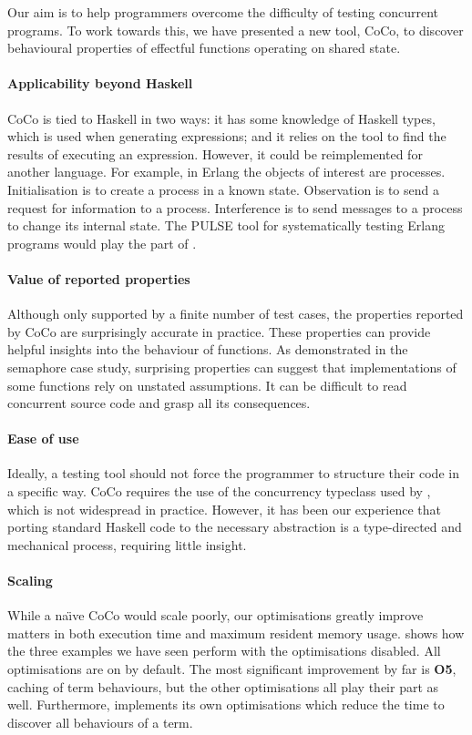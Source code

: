 Our aim is to help programmers overcome the difficulty of testing
concurrent programs.  To work towards this, we have presented a new
tool, CoCo, to discover behavioural properties of effectful functions
operating on shared state.

\paragraph{Applicability beyond Haskell}
CoCo is tied to Haskell in two ways: it has some knowledge of Haskell
types, which is used when generating expressions; and it relies on the
\dejafu{} tool to find the results of executing an expression.
However, it could be reimplemented for another language.  For example,
in Erlang the objects of interest are processes.  Initialisation is to
create a process in a known state.  Observation is to send a request
for information to a process.  Interference is to send messages to a
process to change its internal state.  The PULSE tool for
systematically testing Erlang programs\cite{claessen2009} would play
the part of \dejafu{}.

\paragraph{Value of reported properties}
Although only supported by a finite number of test cases, the
properties reported by CoCo are surprisingly accurate in practice.
These properties can provide helpful insights into the behaviour of
functions.  As demonstrated in the semaphore case study, surprising
properties can suggest that implementations of some functions rely on
unstated assumptions.  It can be difficult to read concurrent source
code and grasp all its consequences.

\paragraph{Ease of use}
Ideally, a testing tool should not force the programmer to structure
their code in a specific way.  CoCo requires the use of the
concurrency typeclass used by \dejafu{}, which is not widespread in
practice.  However, it has been our experience that porting standard
Haskell code to the necessary abstraction is a type-directed and
mechanical process, requiring little insight.

\paragraph{Scaling}
While a na\"{\i}ve CoCo would scale poorly, our optimisations greatly
improve matters in both execution time and maximum resident memory
usage.   shows how the three examples we have
seen perform with the optimisations disabled.  All optimisations are
on by default.  The most significant improvement by far is
\textbf{O5}, caching of term behaviours, but the other optimisations
all play their part as well.  Furthermore, \dejafu{} implements its
own optimisations which reduce the time to discover all behaviours of
a term.

